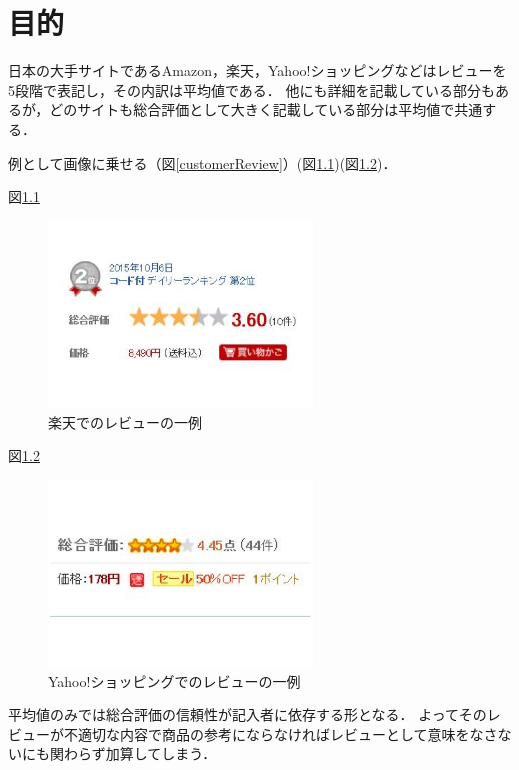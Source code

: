 \chapter{目的}



日本の大手サイトであるAmazon，楽天，Yahoo!ショッピングなどはレビューを5段階で表記し，その内訳は平均値である．
他にも詳細を記載している部分もあるが，どのサイトも総合評価として大きく記載している部分は平均値で共通する．

例として画像に乗せる（図\ref{customerReview}）(図\ref{rakutenReview})(図\ref{Yahoo!Review})．

図\ref{rakutenReview}

\begin{figure}[htbp]

\centering
\includegraphics[width=7cm,clip]{rakutenReview.pdf}
\caption{楽天でのレビューの一例}
\label{rakutenReview}

\end{figure}

図\ref{Yahoo!Review}

\begin{figure}[htbp]

\centering
\includegraphics[width=7cm,clip]{Yahoo!Review.pdf}
\caption{Yahoo!ショッピングでのレビューの一例}
\label{Yahoo!Review}

\end{figure}




平均値のみでは総合評価の信頼性が記入者に依存する形となる．
よってそのレビューが不適切な内容で商品の参考にならなければレビューとして意味をなさないにも関わらず加算してしまう．

